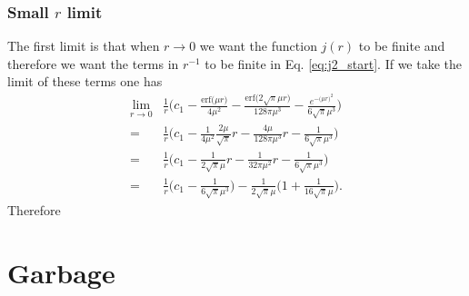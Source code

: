\documentclass[aip,jcp,reprint,noshowkeys,superscriptaddress]{revtex4-1}
\begin{document}
\subsubsection{Small $r$ limit}
The first limit is that when $r \rightarrow 0$ we want the function $j(r)$ to be finite and therefore we want the terms in $r^{-1}$ to be finite in Eq. \eqref{eq:j2_start}. 
If we take the limit of these terms one has 
\begin{equation}
 \begin{aligned}
  \lim_{r\rightarrow 0} &\frac{1}{r}\bigg( c_1 - \frac{\text{erf}\big(\mu r\big)}{4 \mu^2} -\frac{\text{erf}\big(2\sqrt{\pi}\mu r\big)}{128 \pi \mu^3} - \frac{e^{-\big(\mu r \big)^2}}{6\sqrt{\pi}\mu^3} \bigg) \\
 = & \frac{1}{r} \bigg( c_1 - \frac{1}{4\mu^2}\frac{2\mu}{\sqrt{\pi}} r - \frac{4\mu }{128 \pi \mu^3} r - \frac{1}{6\sqrt{\pi}\mu^3} \bigg) \\
 = & \frac{1}{r} \bigg( c_1 - \frac{1}{2\sqrt{\pi}\mu} r - \frac{1}{32 \pi \mu^2} r - \frac{1}{6\sqrt{\pi}\mu^3} \bigg) \\
 = & \frac{1}{r}\bigg( c_1 - \frac{1}{6\sqrt{\pi}\mu^3} \bigg) - \frac{1}{2\sqrt{\pi}\mu} \bigg( 1 + \frac{1}{16\sqrt{\pi}\mu} \bigg).
 \end{aligned}
\end{equation}
Therefore


\section{Garbage}
\end{document}
